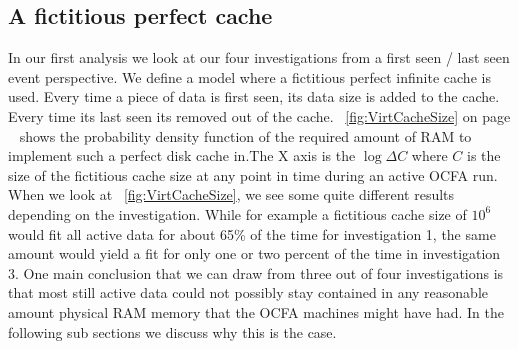 \subsection{A fictitious perfect cache}
In our first analysis we look at our four investigations from a first seen / last seen event perspective. We define a model where a fictitious perfect infinite cache is used. Every time a piece of data is first seen, its data size is added to the cache. Every time its last seen its removed out of the cache. ~\ref{fig:VirtCacheSize} on page ~\pageref{fig:VirtCacheSize} shows the probability density function of the required amount of RAM to implement such a perfect disk cache in.The X axis is the $\log{\Delta C}$ where $C$ is the size of the fictitious cache size at any point in time during an active OCFA run. When we look at ~\ref{fig:VirtCacheSize}, we see some quite different results depending on the investigation. While for example a fictitious cache size of $10^6$ would fit all active data for about 65\% of the time for investigation 1, the same amount would yield a fit for only one or two percent of the time in investigation 3. One main conclusion that we can draw from three out of four investigations is that most still active data could not possibly stay contained in any reasonable amount physical RAM memory that the OCFA machines might have had. In the following sub sections we discuss why this is the case.
